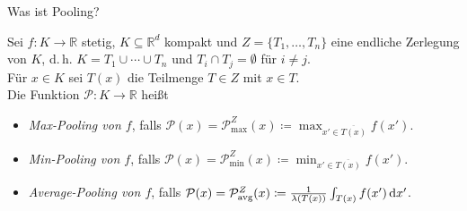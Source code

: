\documentclass[envcountsect, smaller, aspectratio=149]{beamer}
\newcommand{\diff}{\,\textrm{d}}
\newcommand{\R}{\mathbb{R}}
\newcommand{\avg}{\textnormal{avg}}
\begin{document}

\begin{frame}{Was ist Pooling?}
    \begin{definition}[Pooling]
        Sei $f: K \rightarrow \R$ stetig, $K\subseteq \R^d$ kompakt und $Z=\{T_1,\dots, T_n\}$ eine endliche Zerlegung von $K$, d.\,h. $K = T_1 \cup \cdots \cup T_n$ und $T_i \cap T_j = \emptyset$ für $i \neq j$. \\[.5em]

        Für $x\in K$ sei $T(x)$ die Teilmenge $T\in Z$ mit $x\in T$. \\[.5em]

        Die Funktion $\mathcal{P}: K\rightarrow \R$ heißt
        \begin{itemize}
            \item \emph{Max-Pooling von $f$}, falls $\mathcal{P}(x) = \mathcal{P}_{\max}^Z(x) \coloneqq \max_{x'\in \overline{T(x)}} f(x')$.
            \item \emph{Min-Pooling von $f$}, falls $\mathcal{P}(x) = \mathcal{P}_{\min}^Z(x) \coloneqq \min_{x'\in \overline{T(x)}} f(x')$.
            \item \emph{Average-Pooling von $f$}, falls $\mathcal{P}(x) = \mathcal{P}_{\avg}^Z(x) \coloneqq \frac{1}{\lambda(T(x))} \int_{T(x)} f(x') \diff x'$.
        \end{itemize}
    \end{definition}
\end{frame}
\end{document}
